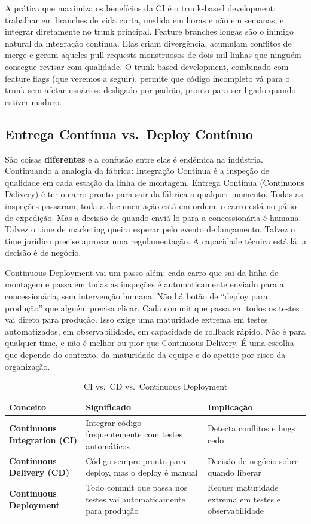 A prática que maximiza os benefícios da CI é o trunk-based development: trabalhar
em branches de vida curta, medida em horas e não em semanas, e integrar
diretamente no trunk principal. Feature branches longas são o inimigo natural da
integração contínua. Elas criam divergência, acumulam conflitos de merge e geram
aqueles pull requests monstruosos de dois mil linhas que ninguém consegue revisar
com qualidade. O trunk-based development, combinado com feature flags (que veremos
a seguir), permite que código incompleto vá para o trunk sem afetar usuários:
desligado por padrão, pronto para ser ligado quando estiver maduro.

\subsection{Entrega Contínua vs.\ Deploy Contínuo}

São coisas \textbf{diferentes} e a confusão entre elas é endêmica na indústria.
Continuando a analogia da fábrica: Integração Contínua é a inspeção de qualidade
em cada estação da linha de montagem. Entrega Contínua (Continuous Delivery) é
ter o carro pronto para sair da fábrica a qualquer momento. Todas as inspeções
passaram, toda a documentação está em ordem, o carro está no pátio de expedição.
Mas a decisão de quando enviá-lo para a concessionária é humana. Talvez o time de
marketing queira esperar pelo evento de lançamento. Talvez o time jurídico precise
aprovar uma regulamentação. A capacidade técnica está lá; a decisão é de negócio.

Continuous Deployment vai um passo além: cada carro que sai da linha de montagem e
passa em todas as inspeções é automaticamente enviado para a concessionária, sem
intervenção humana. Não há botão de ``deploy para produção'' que alguém precisa
clicar. Cada commit que passa em todos os testes vai direto para produção. Isso
exige uma maturidade extrema em testes automatizados, em observabilidade, em
capacidade de rollback rápido. Não é para qualquer time, e não é melhor ou pior
que Continuous Delivery. É uma escolha que depende do contexto, da maturidade
da equipe e do apetite por risco da organização.

\begin{table}[h]
\centering
\caption{CI vs.\ CD vs.\ Continuous Deployment}
\begin{tabular}{>{\bfseries}p{3.5cm} p{4cm} p{5cm}}
\toprule
Conceito & Significado & Implicação \\
\midrule
Continuous Integration (CI) & Integrar código frequentemente com testes automáticos &
    Detecta conflitos e bugs cedo \\
\addlinespace
Continuous Delivery (CD) & Código sempre pronto para deploy, mas o deploy é manual &
    Decisão de negócio sobre quando liberar \\
\addlinespace
\addlinespace
Continuous Deployment & Todo commit que passa nos testes vai automaticamente para
    produção & Requer maturidade extrema em testes e observabilidade \\
\bottomrule
\end{tabular}
\end{table}


